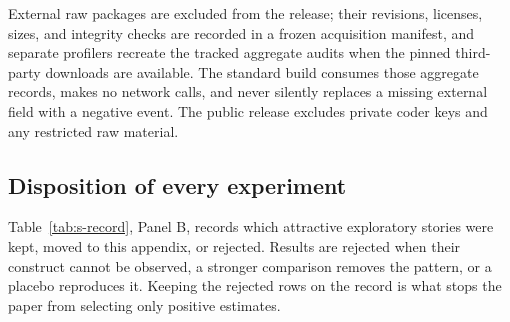\documentclass[pdflatex,sn-basic]{sn-jnl}
\begin{document}
External raw packages are excluded from the release; their revisions, licenses,
sizes, and integrity checks are recorded in a frozen acquisition manifest, and
separate profilers recreate the tracked aggregate audits when the pinned
third-party downloads are available. The standard build consumes those aggregate
records, makes no network calls, and never silently replaces a missing external
field with a negative event. The public release excludes private coder keys and
any restricted raw material.

\subsection{Disposition of every experiment}\label{app:disposition}

Table~\ref{tab:s-record}, Panel B, records which attractive exploratory stories
were kept, moved to this appendix, or rejected. Results are rejected when their
construct cannot be observed, a stronger comparison removes the pattern, or a
placebo reproduces it. Keeping the rejected rows on the record is what stops the
paper from selecting only positive estimates.



\begingroup
\small

\endgroup
\end{document}
